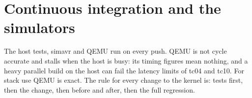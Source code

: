 \section{Continuous integration and the simulators}

The host tests, simavr and QEMU run on every push. QEMU is not cycle accurate and stalls
when the host is busy: its timing figures mean nothing, and a heavy parallel build on
the host can fail the latency limits of tc04 and tc10. For stack use QEMU is exact. The
rule for every change to the kernel is: tests first, then the change, then
 before and after, then the full regression.
